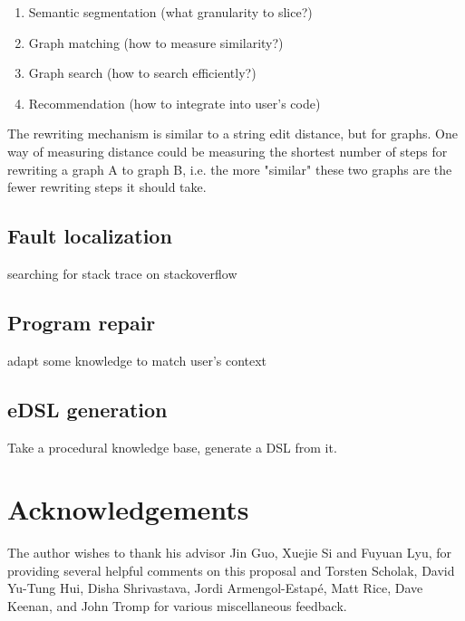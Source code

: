 \documentclass[11pt]{article}
\begin{document}
    \begin{enumerate}
        \item Semantic segmentation (what granularity to slice?)
        \item Graph matching (how to measure similarity?)
        \item Graph search (how to search efficiently?)
        \item Recommendation (how to integrate into user's code)
    \end{enumerate}

    The rewriting mechanism is similar to a string edit distance, but for graphs. One way of measuring distance could be measuring the shortest number of steps for rewriting a graph A to graph B, i.e. the more "similar" these two graphs are the fewer rewriting steps it should take.

    \subsection{Fault localization}

    searching for stack trace on stackoverflow

    \subsection{Program repair}

    adapt some knowledge to match user's context

    \subsection{eDSL generation}

    Take a procedural knowledge base, generate a DSL from it.

    \pagebreak \section{Acknowledgements}

    The author wishes to thank his advisor Jin Guo, Xuejie Si and Fuyuan Lyu, for providing several helpful comments on this proposal and Torsten Scholak, David Yu-Tung Hui, Disha Shrivastava, Jordi Armengol-Estap\'e, Matt Rice, Dave Keenan, and John Tromp for various miscellaneous feedback.

    
    
\end{document}
